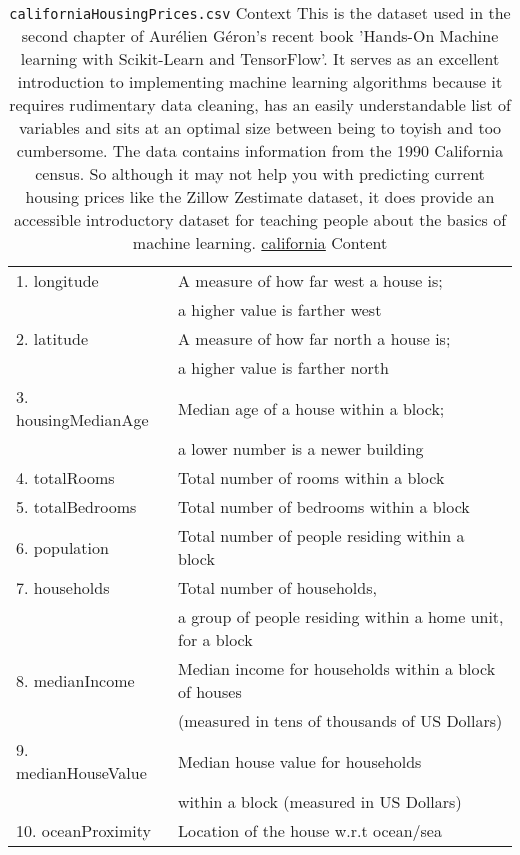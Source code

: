 \documentclass[12pt]{article}
\theoremstyle{remark}
\begin{document}
\begin{table}
	\caption{ \texttt{californiaHousingPrices.csv}
Context
This is the dataset used in the second chapter of Aurélien Géron's recent book 'Hands-On Machine learning with Scikit-Learn and TensorFlow'. It serves as an excellent introduction to implementing machine learning algorithms because it requires rudimentary data cleaning, has an easily understandable list of variables and sits at an optimal size between being to toyish and too cumbersome.
The data contains information from the 1990 California census. So although it may not help you with predicting current housing prices like the Zillow Zestimate dataset, it does provide an accessible introductory dataset for teaching people about the basics of machine learning.
\href{ https://www.kaggle.com/datasets/camnugent/california-housing-prices?select=housing.csv}{california} Content
}
	\begin{tabular}{l|l}\hline
1. longitude & A measure of how far west a house is;
\\ &  a higher value is farther west \\
2. latitude & A measure of how far north a house is;\\
& a higher value is farther north\\
3. housingMedianAge & Median age of a house within a block; \\& a lower number is a newer building\\
4. totalRooms& Total number of rooms within a block\\
5. totalBedrooms & Total number of bedrooms within a block\\
6. population &  Total number of people residing within a block\\
7. households &  Total number of households, \\ & a group of people residing within a home unit, for a block \\
8. medianIncome &  Median income for households within a block of houses \\ & (measured in tens of thousands of US Dollars)\\
9. medianHouseValue &  Median house value for households \\ & within a block (measured in US Dollars)\\
10. oceanProximity & Location of the house w.r.t ocean/sea\\
	\hline
	\end{tabular}
\end{table}
\end{document}
